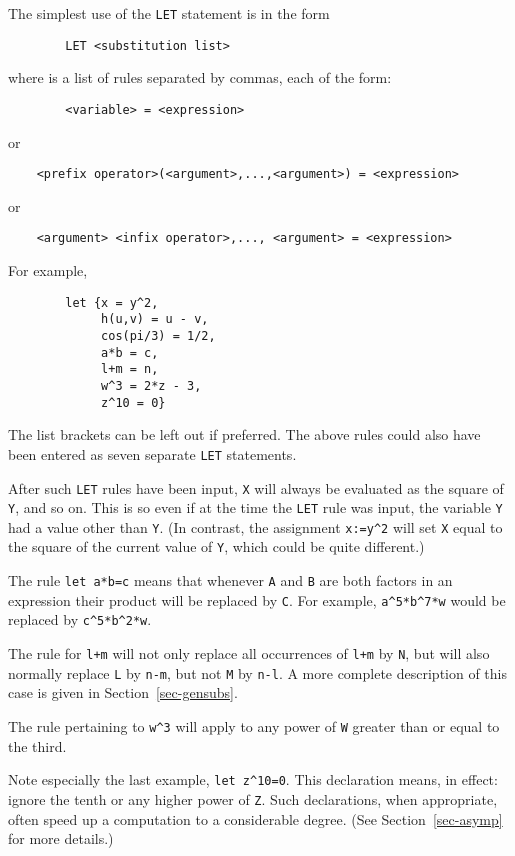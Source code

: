 \documentclass[11pt,letterpaper]{book}
\begin{document}
The simplest use of the {\tt LET} statement is in the form
{\small\begin{verbatim}
        LET <substitution list>
\end{verbatim}}
where {\tt <substitution list>} is a list of rules separated by commas, each
of the form:
{\small\begin{verbatim}
        <variable> = <expression>
\end{verbatim}}
or
{\small\begin{verbatim}
    <prefix operator>(<argument>,...,<argument>) = <expression>
\end{verbatim}}
or
{\small\begin{verbatim}
    <argument> <infix operator>,..., <argument> = <expression>
\end{verbatim}}
For example,
{\small\begin{verbatim}
        let {x = y^2,
             h(u,v) = u - v,
             cos(pi/3) = 1/2,
             a*b = c,
             l+m = n,
             w^3 = 2*z - 3,
             z^10 = 0}
\end{verbatim}}
The list brackets can be left out if preferred.  The above rules could
also have been entered as seven separate {\tt LET} statements.

After such {\tt LET} rules have been input, {\tt X} will always be
evaluated as the square of {\tt Y}, and so on.  This is so even if at the
time the {\tt LET} rule was input, the variable {\tt Y} had a value other
than {\tt Y}. (In contrast, the assignment {\tt x:=y\verb|^|2} will set {\tt X}
equal to the square of the current value of {\tt Y}, which could be quite
different.)

The rule {\tt let a*b=c} means that whenever {\tt A} and {\tt B} are both
factors in an expression their product will be replaced by {\tt C}.  For
example, {\tt a\verb|^|5*b\verb|^|7*w} would be replaced by
{\tt c\verb|^|5*b\verb|^|2*w}.

The rule for {\tt l+m} will not only replace all occurrences of {\tt l+m}
by {\tt N}, but will also normally replace {\tt L} by {\tt n-m}, but not
{\tt M} by {\tt n-l}.  A more complete description of this case is given
in Section~\ref{sec-gensubs}.

The rule pertaining to {\tt w\verb|^|3} will apply to any power of {\tt W}
greater than or equal to the third.

Note especially the last example, {\tt let z\verb|^|10=0}.  This declaration
means, in effect: ignore the tenth or any higher power of {\tt Z}.  Such
declarations, when appropriate, often speed up a computation to a
considerable degree. (See
Section~\ref{sec-asymp} for more details.)
\end{document}

